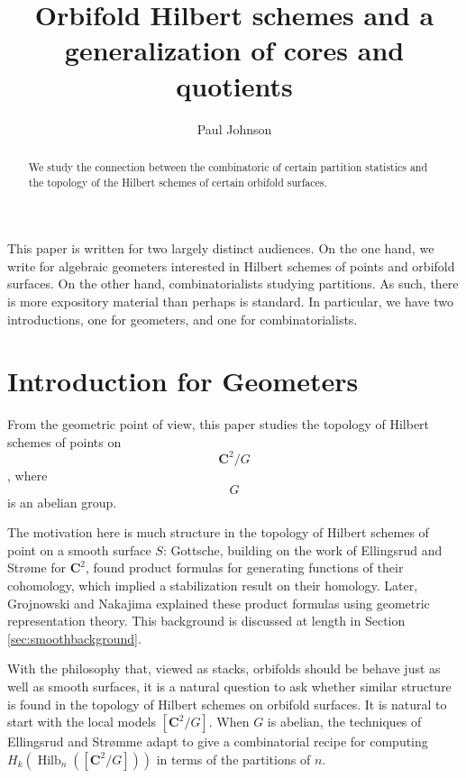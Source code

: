 \documentclass{amsart}[12pt]
\theoremstyle{definition}
\newcommand{\C}{\mathbf{C}}
\DeclareMathOperator{\Hilb}{Hilb}
\begin{document}
\begin{abstract}
We study the connection between the combinatoric of certain partition statistics and the topology of the Hilbert schemes of certain orbifold surfaces.
\end{abstract}


\title{Orbifold Hilbert schemes and a generalization of cores and quotients}


\author{Paul Johnson}
\address{University of Sheffield}


\maketitle
\setcounter{tocdepth}{1}
\tableofcontents
This paper is written for two largely distinct audiences.  On the one hand, we write for algebraic geometers interested in Hilbert schemes of points and orbifold surfaces.  On the other hand, combinatorialists studying partitions.  As such, there is more expository material than perhaps is standard.  In particular, we have two introductions, one for geometers, and one for combinatorialists.


\section{Introduction for Geometers}
\cite{GLMpower}

From the geometric point of view, this paper studies the topology of Hilbert schemes of points on $$\C^2/G$$, where $$G$$ is an abelian group.  

The motivation here is much structure in the topology of Hilbert schemes of point on a smooth surface $S$: Gottsche, building on the work of Ellingsrud and Str\o me for $\C^2$, found product formulas for generating functions of their cohomology, which implied a stabilization result on their homology.  Later, Grojnowski and Nakajima \cite{grojnowski, nakajimaheisenberg} explained these product formulas using geometric representation theory.  This background is discussed at length in Section \ref{sec:smoothbackground}.

With the philosophy that, viewed as stacks, orbifolds should be behave just as well as smooth surfaces, it is a natural question to ask whether similar structure is found in the topology of Hilbert schemes on orbifold surfaces.  It is natural to start with the local models $[\C^2/G]$.  When $G$ is abelian, the techniques of Ellingsrud and Str\o mme adapt to give a combinatorial recipe for computing $H_k(\Hilb_n([\C^2/G]))$ in terms of the partitions of $n$.
\end{document}

